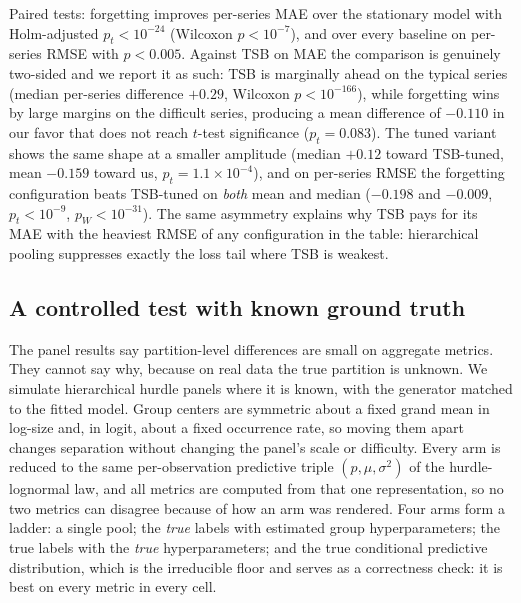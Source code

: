 \documentclass[twocolumn,10pt]{article}
\begin{document}
Paired tests: forgetting improves per-series
MAE over the stationary model with Holm-adjusted $p_t<10^{-24}$
(Wilcoxon $p<10^{-7}$), and over every baseline on per-series RMSE with
$p<0.005$. Against TSB on MAE the comparison is genuinely two-sided and we report
it as such: TSB is marginally ahead on the typical series (median
per-series difference $+0.29$, Wilcoxon $p<10^{-166}$), while forgetting
wins by large margins on the difficult series, producing a mean
difference of $-0.110$ in our favor that does not reach $t$-test
significance ($p_t=0.083$). The tuned variant shows the same shape at a
smaller amplitude (median $+0.12$ toward TSB-tuned, mean $-0.159$ toward
us, $p_t=1.1\times10^{-4}$), and on per-series RMSE the forgetting
configuration beats TSB-tuned on \emph{both} mean and median ($-0.198$
and $-0.009$, $p_t<10^{-9}$, $p_W<10^{-31}$). The same asymmetry
explains why TSB pays for
its MAE with the heaviest RMSE of any configuration in the table:
hierarchical pooling suppresses exactly the loss tail where TSB is
weakest.

\subsection{A controlled test with known ground truth}\label{sec:synthetic}

The panel results say partition-level differences are small on aggregate
metrics. They cannot say why, because on real data the true partition is
unknown. We simulate hierarchical hurdle panels where it is known, with
the generator matched to the fitted model. Group centers are symmetric
about a fixed grand mean in log-size and, in logit, about a fixed
occurrence rate, so moving them apart changes separation without changing
the panel's scale or difficulty. Every arm is reduced to the same
per-observation predictive triple $(p,\mu,\sigma^2)$ of the
hurdle-lognormal law, and all metrics are computed from that one
representation, so no two metrics can disagree because of how an arm was
rendered. Four arms form a ladder: a single pool; the \emph{true} labels
with estimated group hyperparameters; the true labels with the
\emph{true} hyperparameters; and the true conditional predictive
distribution, which is the irreducible floor and serves as a correctness
check: it is best on every metric in every cell.
\end{document}
